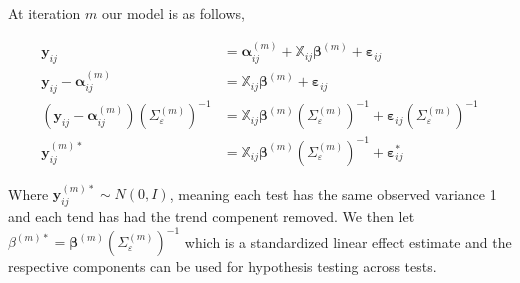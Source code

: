 \documentclass[
]{article}
\begin{document}
At iteration \(m\) our model is as follows,

\begin{equation*}
\begin{aligned}
\boldsymbol{y}_{ij} &= \boldsymbol{\alpha}_{ij}^{(m)} + \boldsymbol{ \mathbb{X}}_{ij} \boldsymbol{\beta}^{(m)} + \boldsymbol{\varepsilon}_{ij}\\
\boldsymbol{y}_{ij}-\boldsymbol{\alpha}_{ij}^{(m)} &=   \boldsymbol{ \mathbb{X}}_{ij} \boldsymbol{\beta}^{(m)} + \boldsymbol{\varepsilon}_{ij}\\
(\boldsymbol{y}_{ij}-\boldsymbol{\alpha}_{ij}^{(m)})(\Sigma_{\varepsilon}^{(m)})^{-1} &=   \boldsymbol{ \mathbb{X}}_{ij} \boldsymbol{\beta}^{(m)}(\Sigma_{\varepsilon}^{(m)})^{-1} + \boldsymbol{\varepsilon}_{ij}(\Sigma_{\varepsilon}^{(m)})^{-1}\\
\boldsymbol{y}_{ij}^{(m)*} &= \boldsymbol{ \mathbb{X}}_{ij} \boldsymbol{\beta}^{(m)}(\Sigma_{\varepsilon}^{(m)})^{-1} + \boldsymbol{\varepsilon}_{ij}^*
\end{aligned}
\end{equation*}

Where \(\boldsymbol{y}_{ij}^{(m)*}\sim N(0, I)\), meaning each test has the same observed variance 1 and each tend has had the trend compenent removed. We then let \(\beta^{(m)*} = \boldsymbol{\beta}^{(m)}(\Sigma_{\varepsilon}^{(m)})^{-1}\) which is a standardized linear effect estimate and the respective components can be used for hypothesis testing across tests.
\end{document}
